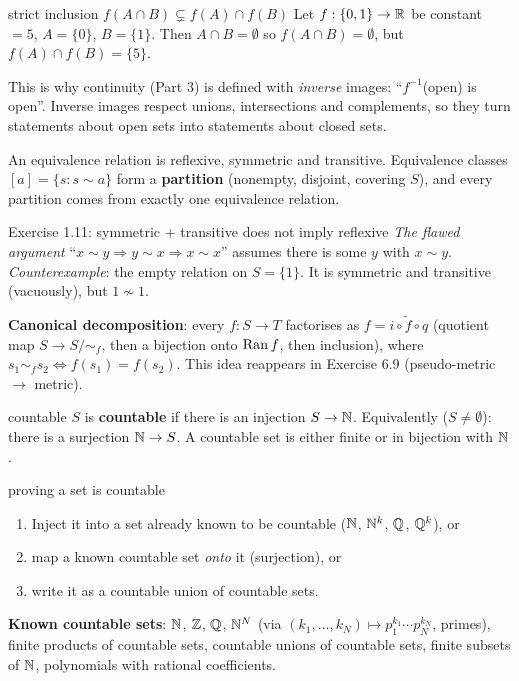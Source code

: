 \begin{example}{strict inclusion $f(A\cap B)\subsetneq f(A)\cap f(B)$}
Let $f:\{0,1\}\to\mathbb R$ be constant $=5$, $A=\{0\}$, $B=\{1\}$. Then $A\cap B=\emptyset$ so
$f(A\cap B)=\emptyset$, but $f(A)\cap f(B)=\{5\}$.
\end{example}

\begin{plain}
This is why continuity (Part 3) is defined with \emph{inverse} images: ``$f^{-1}$(open) is
open''. Inverse images respect unions, intersections and complements, so they turn statements
about open sets into statements about closed sets.
\end{plain}

An equivalence relation is reflexive, symmetric and transitive. Equivalence classes
$[a]=\{s:s\sim a\}$ form a \textbf{partition} (nonempty, disjoint, covering $S$), and every
partition comes from exactly one equivalence relation.

\begin{example}{Exercise 1.11: symmetric + transitive does not imply reflexive}
\emph{The flawed argument} ``$x\sim y\Rightarrow y\sim x\Rightarrow x\sim x$'' assumes there is
some $y$ with $x\sim y$. \emph{Counterexample}: the empty relation on $S=\{1\}$. It is
symmetric and transitive (vacuously), but $1\not\sim1$.
\end{example}

\textbf{Canonical decomposition}: every $f:S\to T$ factorises as
$f=i\circ\tilde f\circ q$ (quotient map $S\to S/\!\sim_f$, then a bijection onto $\operatorname{Ran} f$, then
inclusion), where $s_1\sim_f s_2\iff f(s_1)=f(s_2)$. This idea reappears in Exercise 6.9
(pseudo-metric $\to$ metric).

\begin{defn}{countable}
$S$ is \textbf{countable} if there is an injection $S\to\mathbb N$. Equivalently ($S\ne\emptyset$):
there is a surjection $\mathbb N\to S$. A countable set is either finite or in bijection with $\mathbb N$.
\end{defn}

\begin{steps}{proving a set is countable}
\begin{enumerate}
\item Inject it into a set already known to be countable ($\mathbb N$, $\mathbb N^k$, $\mathbb Q$, $\mathbb Q^k$), or
\item map a known countable set \emph{onto} it (surjection), or
\item write it as a countable union of countable sets.
\end{enumerate}
\textbf{Known countable sets}: $\mathbb N$, $\mathbb Z$, $\mathbb Q$, $\mathbb N^N$ (via $(k_1,\dots,k_N)\mapsto
p_1^{k_1}\cdots p_N^{k_N}$, primes), finite products of countable sets, countable unions of
countable sets, finite subsets of $\mathbb N$, polynomials with rational coefficients.
\end{steps}

